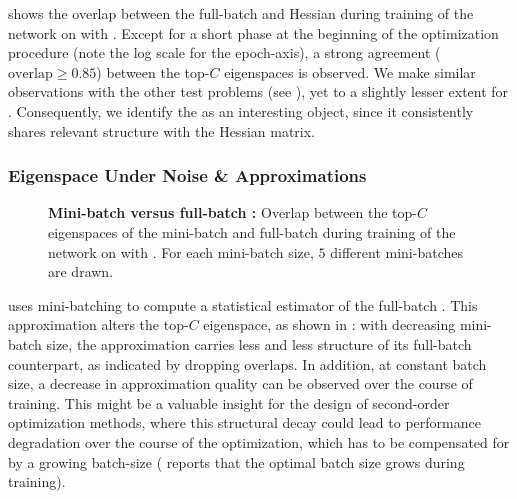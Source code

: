  shows the overlap between the full-batch \ggn and
Hessian during training of the \threecthreed network on \cifarten with \sgd{}.
Except for a short phase at the beginning of the optimization procedure (note
the log scale for the epoch-axis), a strong agreement ($\text{overlap} \geq
0.85$) between the top-$C$ eigenspaces is observed. We make similar observations
with the other test problems (see ), yet to a slightly
lesser extent for \cifarhun{}. Consequently, we identify the \ggn as an
interesting object, since it consistently shares relevant structure with the
Hessian matrix.


\subsubsection{Eigenspace Under Noise \& Approximations}

\begin{figure}[t]
  \centering
  
  \tikzexternalenable
  
  \tikzexternaldisable

  \caption{ \textbf{Mini-batch \ggn versus full-batch \ggn{}:} Overlap between the
    top-$C$ eigenspaces of the mini-batch \ggn and full-batch \ggn during training
    of the \threecthreed network on \cifarten with \sgd{}. For each mini-batch
    size, $5$ different mini-batches are drawn. }\label{vivit::fig:approx_eigenspace_bs}
\end{figure}

%
\vivit uses mini-batching to compute a statistical estimator of the full-batch
\ggn{}. This approximation alters the top-$C$ eigenspace, as shown in
: with decreasing mini-batch size, the
approximation carries less and less structure of its full-batch counterpart, as
indicated by dropping overlaps. In addition, at constant batch size, a decrease
in approximation quality can be observed over the course of training. This might
be a valuable insight for the design of second-order optimization methods, where
this structural decay could lead to performance degradation over the course of
the optimization, which has to be compensated for by a growing batch-size (\eg
\citet{martens2010deep} reports that the optimal batch size grows during
training).


